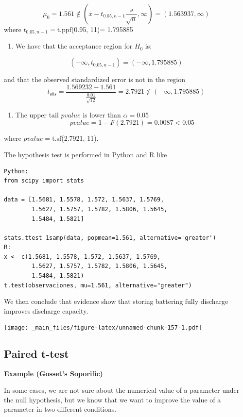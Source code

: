 \documentclass[
]{book}
\providecommand{\tightlist}{%
  \setlength{\itemsep}{0pt}\setlength{\parskip}{0pt}}
\begin{document}
\[\mu_0=1.561 \notin (\bar{x}-t_{0.05, n-1} \frac{s}{\sqrt{n}}, \infty)=(1.563937, \infty)\]
where \(t_{0.05, n-1}=\)t.ppf(0.95, 11)= 1.795885

\begin{enumerate}
\def\labelenumi{\arabic{enumi}.}
\setcounter{enumi}{1}
\tightlist
\item
  We have that the acceptance region for \(H_0\) is:
\end{enumerate}

\[(-\infty, t_{0.05, n-1})=( -\infty,  1.795885)\]

and that the observed standardized error is not in the region
\[t_{obs} =  \frac{1.569232-1.561}{\frac{0.01}{\sqrt{12}}}=2.7921 \notin ( -\infty,  1.795885)\]

\begin{enumerate}
\def\labelenumi{\arabic{enumi}.}
\setcounter{enumi}{2}
\tightlist
\item
  The upper tail \(pvalue\) is lower than \(\alpha=0.05\)
  \[pvalue=1-F(2.7921)=0.0087 <0.05\]
\end{enumerate}

where \(pvalue=\)t.sf(2.7921, 11).

The hypothesis test is performed in Python and R like

\begin{verbatim}
Python:
from scipy import stats

data = [1.5681, 1.5578, 1.572, 1.5637, 1.5769,
        1.5627, 1.5757, 1.5782, 1.5806, 1.5645,
        1.5484, 1.5821]

stats.ttest_1samp(data, popmean=1.561, alternative='greater')
R:
x <- c(1.5681, 1.5578, 1.572, 1.5637, 1.5769,
        1.5627, 1.5757, 1.5782, 1.5806, 1.5645,
        1.5484, 1.5821)
t.test(observaciones, mu=1.561, alternative="greater")
\end{verbatim}

We then conclude that evidence show that storing battering fully discharge improves discharge capacity.

\texttt{[image: \_main\_files/figure-latex/unnamed-chunk-157-1.pdf]}

\hypertarget{paired-t-test}{%
\subsection{Paired t-test}\label{paired-t-test}}

\textbf{Example (Gosset's Soporific)}

In some cases, we are not sure about the numerical value of a parameter under the null hypothesis, but we know that we want to improve the value of a parameter in two different conditions.
\end{document}
